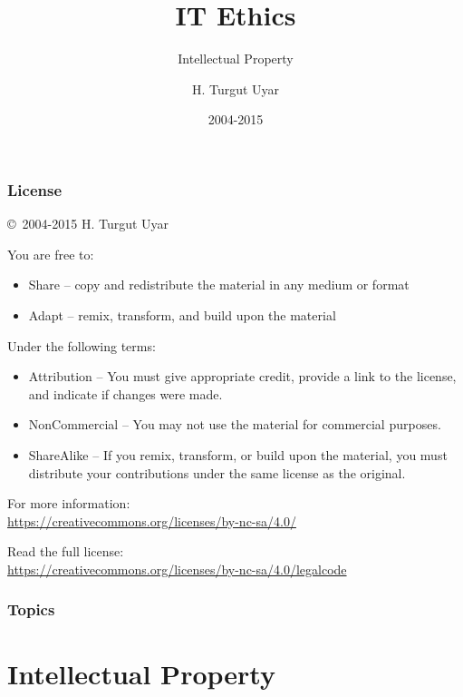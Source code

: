 \documentclass[dvipsnames]{beamer}
\title{IT Ethics}
\subtitle{Intellectual Property}
\author{H. Turgut Uyar}
\date{2004-2015}
\theoremstyle{plain}
\begin{document}
\begin{frame}
  \titlepage
\end{frame}

\begin{frame}
  \frametitle{License}

  \hfill
  \copyright~2004-2015 H. Turgut Uyar

  \vfill
  \begin{footnotesize}
    You are free to:
    \begin{itemize}
      \itemsep0em
      \item Share -- copy and redistribute the material in any medium or format
      \item Adapt -- remix, transform, and build upon the material
    \end{itemize}

    Under the following terms:
    \begin{itemize}
      \itemsep0em
      \item Attribution -- You must give appropriate credit, provide a link to
        the license, and indicate if changes were made.

      \item NonCommercial -- You may not use the material for commercial
        purposes.

      \item ShareAlike -- If you remix, transform, or build upon the material,
        you must distribute your contributions under the same license as the
        original.
    \end{itemize}
  \end{footnotesize}

  \begin{small}
    For more information:\\
    \url{https://creativecommons.org/licenses/by-nc-sa/4.0/}

    \smallskip
    Read the full license:\\
    \url{https://creativecommons.org/licenses/by-nc-sa/4.0/legalcode}
  \end{small}
\end{frame}

\begin{frame}
  \frametitle{Topics}
  \tableofcontents
\end{frame}

\section{Intellectual Property}
\end{document}
